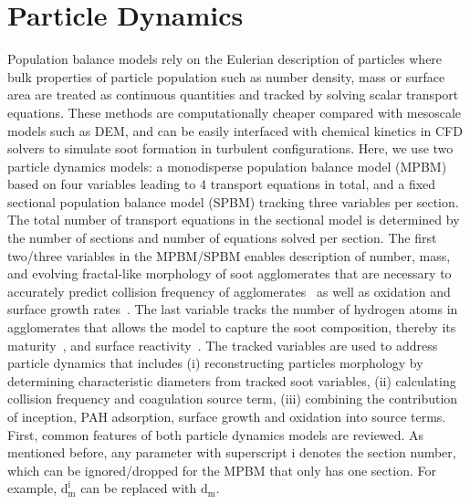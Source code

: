 \section{Particle Dynamics}
Population balance models rely on the Eulerian description of particles where bulk properties of particle population such as number density, mass or surface area are treated as continuous quantities and tracked by solving scalar transport equations. These methods are computationally cheaper compared with mesoscale models such as DEM, and can be easily interfaced with chemical kinetics in CFD solvers to simulate soot formation in turbulent configurations. Here, we use two particle dynamics models: a monodisperse population balance model (MPBM) based on four variables leading to 4 transport equations in total, and a fixed sectional population balance model (SPBM) tracking three variables per section. The total number of transport equations in the sectional model is determined by the number of sections and number of equations solved per section. The first two/three variables in the MPBM/SPBM enables description of number, mass, and evolving fractal-like morphology of soot agglomerates that are necessary to accurately predict collision frequency of agglomerates~\citep{mulholland1988cluster} as well as oxidation and surface growth rates~\citep{kelesidis2019estimating}. The last variable tracks the number of hydrogen atoms in agglomerates that allows the model to capture the soot composition, thereby its maturity~\citep{kholghy2016core}, and surface reactivity~\citep{blanquart2009analyzing}.  
The tracked variables are used to address particle dynamics that includes (i) reconstructing particles morphology by determining characteristic diameters from tracked soot variables, (ii) calculating collision frequency and coagulation source term, (iii) combining the contribution of inception, PAH adsorption, surface growth and oxidation into source terms.
First, common features of both particle dynamics models are reviewed. As mentioned before, any parameter with superscript i denotes the section number, which can be ignored/dropped for the MPBM that only has one section. For example, $\mathrm{d^i_m}$ can be replaced with $\mathrm{d_m}$.

